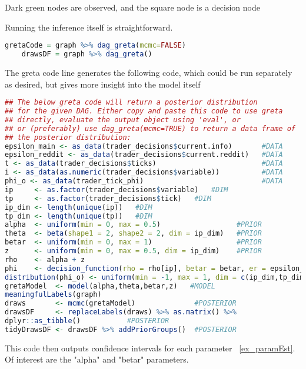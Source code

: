 \documentclass[a4paper, 11pt]{report}
\begin{document}
Dark green nodes are observed, and the square node is a decision node


Running the inference itself is straightforward.

\begin{lstlisting}[language=R]
 	 gretaCode = graph %>% dag_greta(mcmc=FALSE)
	drawsDF = graph %>% dag_greta()
\end{lstlisting}

The greta code line generates the following code, which could be run separately as desired, but gives more insight into the model itself

\begin{lstlisting}[language=R]
## The below greta code will return a posterior distribution 
## for the given DAG. Either copy and paste this code to use greta
## directly, evaluate the output object using 'eval', or 
## or (preferably) use dag_greta(mcmc=TRUE) to return a data frame of
## the posterior distribution: 
epsilon_main <- as_data(trader_decisions$current.info)       #DATA
epsilon_reddit <- as_data(trader_decisions$current.reddit)   #DATA
t <- as_data(trader_decisions$ticks)                         #DATA
i <- as_data(as.numeric(trader_decisions$variable))          #DATA
phi_o <- as_data(trader_tick_phi)                            #DATA
ip     <- as.factor(trader_decisions$variable)   #DIM
tp     <- as.factor(trader_decisions$tick)   #DIM
ip_dim <- length(unique(ip))   #DIM
tp_dim <- length(unique(tp))   #DIM
alpha  <- uniform(min = 0, max = 0.5)                  #PRIOR
theta  <- beta(shape1 = 2, shape2 = 2, dim = ip_dim)   #PRIOR
betar  <- uniform(min = 0, max = 1)                    #PRIOR
z      <- uniform(min = 0, max = 0.5, dim = ip_dim)    #PRIOR
rho    <- alpha + z                                                                                                            #OPERATION
phi    <- decision_function(rho = rho[ip], betar = betar, er = epsilon_reddit[tp], em = epsilon_main[tp], theta = theta[ip])   #OPERATION
distribution(phi_o) <- uniform(min = -1, max = 1, dim = c(ip_dim,tp_dim))   #LIKELIHOOD
gretaModel  <- model(alpha,theta,betar,z)   #MODEL
meaningfulLabels(graph)
draws       <- mcmc(gretaModel)              #POSTERIOR
drawsDF     <- replaceLabels(draws) %>% as.matrix() %>%
dplyr::as_tibble()           #POSTERIOR
tidyDrawsDF <- drawsDF %>% addPriorGroups()  #POSTERIOR
\end{lstlisting}

This code then outputs confidence intervals for each parameter ~\autoref{ex_paramEst}. Of interest are the "alpha" and "betar" parameters.
\end{document}
